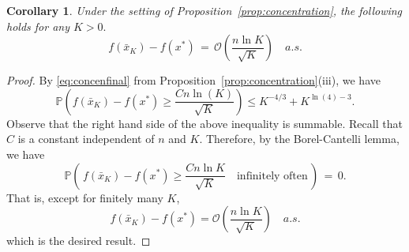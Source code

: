 \documentclass[11pt,reqno]{amsart}
\newcommand{\1}{{\bf 1}}
\newcommand{\2}{{\bf 2}}
\numberwithin{equation}{section}
\newtheorem{corollary}{Corollary}[section]
\theoremstyle{remark}
\begin{document}
{	\begin{corollary}
		Under the setting of Proposition~\ref{prop:concentration}, the following holds for any $K > 0.$
		\begin{equation*}
			f(\bar{x}_K)-f(x^*)\, = \, \mathcal{O}\left(\frac{n \ln K}{\sqrt{K}}\right) \quad a.s.
		\end{equation*}
	\end{corollary}
	\begin{proof}
	By \eqref{eq:concenfinal} from Proposition~\ref{prop:concentration}{(iii)}, we have
	\begin{equation}
		\mathbb{P}\left(f(\bar{x}_K)-f(x^*)\geq\frac{Cn\ln(K)}{\sqrt{K}}\right)\leq K^{-4/3}+K^{\ln(4)-3}.
	\end{equation}
	Observe that the right hand side of the above inequality is summable. Recall that $C$ is a constant independent of $n$ and $K$. Therefore, by the Borel-Cantelli lemma, we have
	\begin{equation*}
		\mathbb{P}\left(\, f(\bar{x}_K)-f(x^*)\geq \frac{Cn\ln K}{\sqrt{K}} \quad {\mbox{infinitely often} }\, \right)\, =\, 0.
	\end{equation*}
	That is, except for finitely many $K$, 
	\begin{equation*}
		f(\bar{x}_K)-f(x^*)=\mathcal{O}\left(\frac{n \ln K}{\sqrt{K}}\right) \quad a.s.
	\end{equation*}
	which is the desired result.
	\end{proof}
	
}
\end{document}
